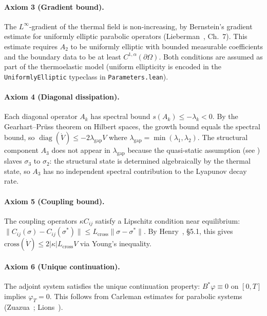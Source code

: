 \documentclass[11pt,a4paper]{article}
\theoremstyle{plain}
\theoremstyle{definition}
\theoremstyle{remark}
\newcommand{\norm}[1]{\lVert #1 \rVert}
\newcommand{\abs}[1]{\lvert #1 \rvert}
\newcommand{\kk}{\kappa}
\newcommand{\leaninline}[1]{\texttt{#1}}
\DeclareMathOperator{\diag}{diag}
\begin{document}
\paragraph{Axiom 3 (Gradient bound).}
The $L^\infty$-gradient of the thermal field is non-increasing, by
Bernstein's gradient estimate for uniformly elliptic parabolic operators
(Lieberman~\cite{Lieberman1996}, Ch.~7).  This estimate requires
$A_2$ to be uniformly elliptic with bounded measurable coefficients
and the boundary data to be at least $C^{1,\alpha}(\partial\Omega)$.
Both conditions are assumed as part of the thermoelastic model
(uniform ellipticity is encoded in the \leaninline{UniformlyElliptic}
typeclass in \leaninline{Parameters.lean}).

\paragraph{Axiom 4 (Diagonal dissipation).}
Each diagonal operator $A_k$ has spectral bound $s(A_k) \le -\lambda_k
< 0$.  By the Gearhart--Pr\"{u}ss theorem on Hilbert spaces, the growth
bound equals the spectral bound, so
$\diag(\dot{V}) \le -2\lambda_{\mathrm{gap}} V$ where
$\lambda_{\mathrm{gap}} = \min(\lambda_1, \lambda_2)$.  The structural
component $A_3$ does not appear in $\lambda_{\mathrm{gap}}$ because the
quasi-static assumption (see ) slaves $\sigma_3$
to $\sigma_2$: the structural state is determined algebraically by the
thermal state, so $A_3$ has no independent spectral contribution to the
Lyapunov decay rate.

\paragraph{Axiom 5 (Coupling bound).}
The coupling operators $\kk C_{ij}$ satisfy a Lipschitz condition near
equilibrium: $\norm{C_{ij}(\sigma) - C_{ij}(\sigma^*)} \le
L_{\mathrm{cross}} \norm{\sigma - \sigma^*}$.  By Henry~\cite{Henry1981},
\S5.1, this gives $\mathrm{cross}(\dot{V}) \le 2\abs{\kk}
L_{\mathrm{cross}} V$ via Young's inequality.

\paragraph{Axiom 6 (Unique continuation).}
The adjoint system satisfies the unique continuation property:
$B^*\varphi \equiv 0$ on $[0,T]$ implies $\varphi_T = 0$.
This follows from Carleman estimates for parabolic systems
(Zuazua~\cite{Zuazua2007}; Lions~\cite{Lions1988}).
\end{document}
